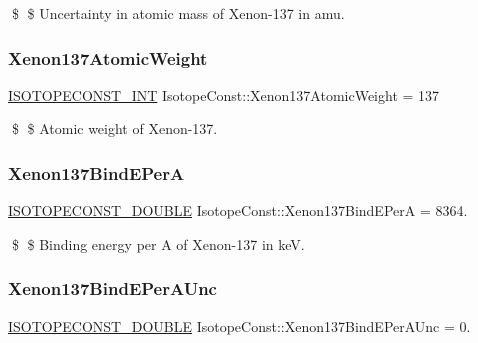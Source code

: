 \$ \$ Uncertainty in atomic mass of Xenon-\/137 in amu. \mbox{\label{group___isotope_const-_xenon-_xe137_ga0b7f93eae4a601d34db59b05e3e570c6}} 
\subsubsection{\texorpdfstring{Xenon137\+Atomic\+Weight}{Xenon137AtomicWeight}}
{\footnotesize\ttfamily \mbox{\hyperlink{group___isotope_const-_macros_ga5f18360b3e99483a35c32d789e62621c}{I\+S\+O\+T\+O\+P\+E\+C\+O\+N\+S\+T\+\_\+\+I\+NT}} Isotope\+Const\+::\+Xenon137\+Atomic\+Weight = 137}

\$ \$ Atomic weight of Xenon-\/137. \mbox{\label{group___isotope_const-_xenon-_xe137_ga4d715cd64747edb9772ce1555320e8c1}} 
\subsubsection{\texorpdfstring{Xenon137\+Bind\+E\+PerA}{Xenon137BindEPerA}}
{\footnotesize\ttfamily \mbox{\hyperlink{group___isotope_const-_macros_ga8f45a7272ce02c0b4c65c44636ed719a}{I\+S\+O\+T\+O\+P\+E\+C\+O\+N\+S\+T\+\_\+\+D\+O\+U\+B\+LE}} Isotope\+Const\+::\+Xenon137\+Bind\+E\+PerA = 8364.}

\$ \$ Binding energy per A of Xenon-\/137 in keV. \mbox{\label{group___isotope_const-_xenon-_xe137_gacb792f1924d035144cdadfea25717dd2}} 
\subsubsection{\texorpdfstring{Xenon137\+Bind\+E\+Per\+A\+Unc}{Xenon137BindEPerAUnc}}
{\footnotesize\ttfamily \mbox{\hyperlink{group___isotope_const-_macros_ga8f45a7272ce02c0b4c65c44636ed719a}{I\+S\+O\+T\+O\+P\+E\+C\+O\+N\+S\+T\+\_\+\+D\+O\+U\+B\+LE}} Isotope\+Const\+::\+Xenon137\+Bind\+E\+Per\+A\+Unc = 0.}

